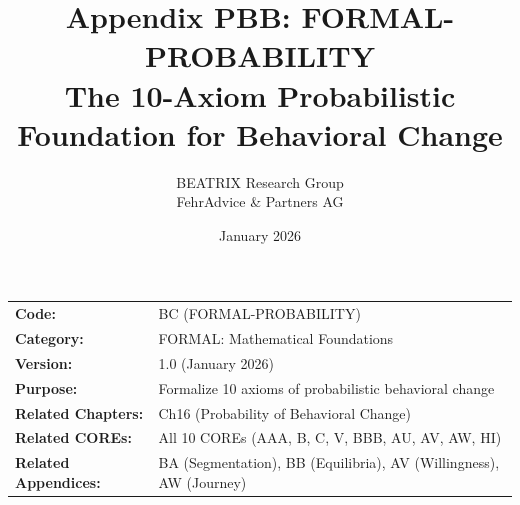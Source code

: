 \documentclass[11pt, a4paper]{article}
\title{Appendix PBB: FORMAL-PROBABILITY\\
The 10-Axiom Probabilistic Foundation for Behavioral Change}
\author{BEATRIX Research Group \\ FehrAdvice \& Partners AG}
\date{January 2026}
\begin{document}
\maketitle


\begin{tcolorbox}[colback=gray!10!white, colframe=gray!75!black, title=Appendix Metadata]
\begin{tabular}{@{}ll@{}}
\textbf{Code:} & BC (FORMAL-PROBABILITY) \\
\textbf{Category:} & FORMAL: Mathematical Foundations \\
\textbf{Version:} & 1.0 (January 2026) \\
\textbf{Purpose:} & Formalize 10 axioms of probabilistic behavioral change \\
\textbf{Related Chapters:} & Ch16 (Probability of Behavioral Change) \\
\textbf{Related COREs:} & All 10 COREs (AAA, B, C, V, BBB, AU, AV, AW, HI) \\
\textbf{Related Appendices:} & BA (Segmentation), BB (Equilibria), AV (Willingness), AW (Journey) \\
\end{tabular}
\end{tcolorbox}

\end{document}
